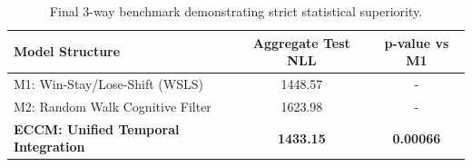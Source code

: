 \documentclass[11pt,twoside,a4paper]{article}
\begin{document}
\begin{table}[h]
    \centering
    \begin{tabular}{lcc}
        \toprule
        \textbf{Model Structure} & \textbf{Aggregate Test NLL} & \textbf{p-value vs M1} \\
        \midrule
        M1: Win-Stay/Lose-Shift (WSLS) & 1448.57 & - \\
        M2: Random Walk Cognitive Filter & 1623.98 & - \\
        \textbf{ECCM: Unified Temporal Integration} & \textbf{1433.15} & \textbf{0.00066} \\
        \bottomrule
    \end{tabular}
    \caption{Final 3-way benchmark demonstrating strict statistical superiority.}
\end{table}
\end{document}
